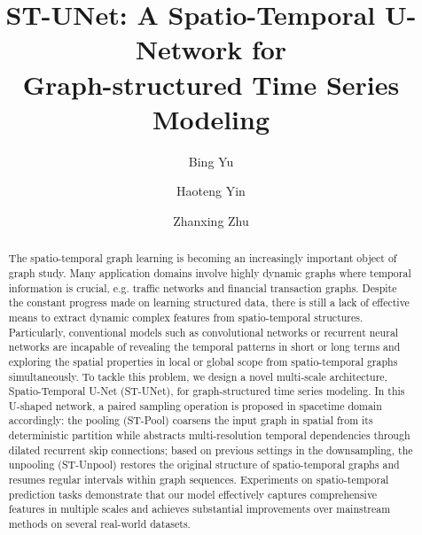 \documentclass[sigconf,screen]{acmart}
\begin{document}
\title{ST-UNet: A Spatio-Temporal U-Network for \\ Graph-structured Time Series Modeling}





\author{Bing Yu}

\author{Haoteng Yin}
\authornotemark[1]

\author{Zhanxing Zhu}

\begin{abstract}
The spatio-temporal graph learning is becoming an increasingly important object of graph study. Many application domains involve highly dynamic graphs where temporal information is crucial, e.g. traffic networks and financial transaction graphs. Despite the constant progress made on learning structured data, there is still a lack of effective means to extract dynamic complex features from spatio-temporal structures. Particularly, conventional models such as convolutional networks or recurrent neural networks are incapable of revealing the temporal patterns in short or long terms and exploring the spatial properties in local or global scope from spatio-temporal graphs simultaneously. To tackle this problem, we design a novel multi-scale architecture, Spatio-Temporal U-Net (ST-UNet), for graph-structured time series modeling. In this U-shaped network, a paired sampling operation is proposed in spacetime domain accordingly: the pooling (ST-Pool) coarsens the input graph in spatial from its deterministic partition while abstracts multi-resolution temporal dependencies through dilated recurrent skip connections; based on previous settings in the downsampling, the unpooling (ST-Unpool) restores the original structure of spatio-temporal graphs and resumes regular intervals within graph sequences. Experiments on spatio-temporal prediction tasks demonstrate that our model effectively captures comprehensive features in multiple scales and achieves substantial improvements over mainstream methods on several real-world datasets.
\end{abstract}
\end{document}
